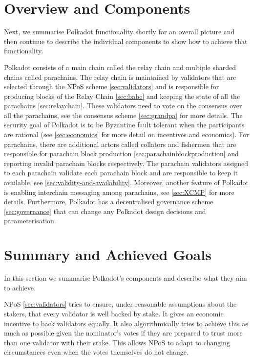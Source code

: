 \section{Overview and Components}\label{sec:components}
Next, we summarise Polkadot functionality shortly for an overall picture and then continue to describe the individual components to show how to achieve that functionality.

Polkadot consists of a main chain called the relay chain and multiple sharded chains called parachains. The relay chain is maintained by validators that are selected through the NPoS scheme \ref{sec:validators} and is responsible for producing blocks of the  Relay Chain \ref{sec:babe} and keeping the state of all the parachains \ref{sec:relaychain}.
These validators need to vote on the consensus over all the parachains, see the consensus scheme \ref{sec:grandpa} for more details.
The security goal of Polkadot is to be Byzantine fault tolerant when the participants are rational (see \ref{sec:economics} for more detail on incentives and economics).
For parachains, there are additional actors called collators and fishermen that are responsible for parachain block production \ref{sec:parachainblockproduction} and reporting invalid parachain blocks respectively.
The parachain validators assigned to each parachain validate each parachain block and are responsible to keep it available, see \ref{sec:validity-and-availability}. Moreover, another feature of Polkadot is enabling interchain messaging among parachains, see \ref{sec:XCMP} for more details.
Furthermore, Polkadot has a decentralised governance scheme \ref{sec:governance} that can change any Polkadot design decisions and parameterisation.










\section{Summary and Achieved Goals}\label{sec:summary}
In this section we summarise Polkadot's components and describe what they aim to achieve. 

NPoS \ref{sec:validators} tries to ensure, under reasonable assumptions about the stakers, that every validator is well backed by stake. It gives an economic incentive to back validators equally. It also algorithmically tries to achieve this as much as possible given the nominator's votes if they are prepared to trust more than one validator with their stake.  This allows NPoS to adapt to changing circumstances even when the votes themselves do not change.

